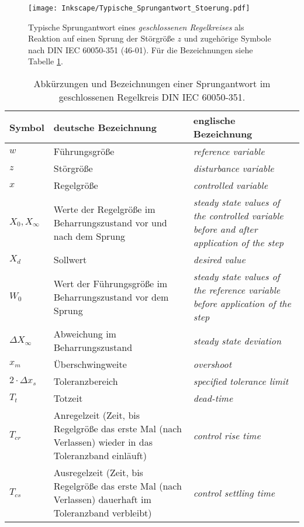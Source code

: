 \begin{figure}[hbtp]
    \begin{center}
        \texttt{[image: Inkscape/Typische\_Sprungantwort\_Stoerung.pdf]}\\
    \end{center}
    \caption{Typische Sprungantwort eines \emph{geschlossenen Regelkreises} als Reaktion auf einen Sprung der Störgröße $z$ und zugehörige Symbole nach DIN IEC 60050-351 (46-01). Für die Bezeichnungen siehe Tabelle \ref{tab:SprungantwortRegelkreis}.}
    \label{fig:typ_Sprungantwort_Stoerung}
\end{figure}
\begin{table}[hbtp]
    \centering
        \begin{small}
        \begin{tabular}{|l| p{6.4cm}| p{6.4cm}|} \hline
        \rowcolor{lightgray}\textbf{Symbol} &\textbf{deutsche Bezeichnung} &\textbf{englische Bezeichnung} \\ \hline
        $w$ & Führungsgröße & \textit{reference variable}\\
        $z$ & Störgröße & \textit{disturbance variable}\\
        $x$ & Regelgröße & \textit{controlled variable}\\
        $X_0, X_{\infty}$ & \raggedright Werte der Regelgröße im Behar\-rungszustand vor und nach dem Sprung & \textit{steady state values of the controlled variable before and after application of the step}\\
        $X_{d}$ & \raggedright Sollwert & \textit{desired value}\\
        $W_0$ & \raggedright Wert der Führungsgröße im Behar\-rungszustand vor dem Sprung & \textit{steady state values of the reference variable before application of the step}\\
        $\Delta X_\infty$ & \raggedright Abweichung im Beharrungszustand & \textit{steady state deviation}\\
        $x_{m}$ & \raggedright Überschwingweite & \textit{overshoot}\\
        $2\cdot\Delta x_{s}$ & Toleranzbereich & \textit{specified tolerance limit}\\
        $T_t$ & Totzeit & \textit{dead-time}\\
        $T_{cr}$ & Anregelzeit (Zeit, bis Regelgröße das erste Mal (nach Verlassen) wieder in das Toleranzband einläuft) & \textit{control rise time}\\
        $T_{cs}$ & Ausregelzeit (Zeit, bis Regelgröße das erste Mal (nach Verlassen) dauerhaft im Toleranzband verbleibt)& \textit{control settling time}\\\hline
        \end{tabular}
        \end{small}
    \caption{Abkürzungen und Bezeichnungen einer Sprungantwort im geschlossenen Regelkreis DIN IEC 60050-351.}
    \label{tab:SprungantwortRegelkreis}
\end{table}

